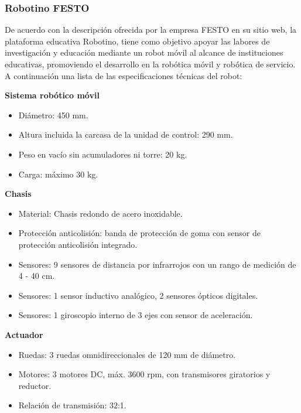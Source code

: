             \subsubsection{Robotino FESTO}
            De acuerdo con la descripción ofrecida por la empresa FESTO en su sitio web, la plataforma educativa Robotino, tiene como objetivo apoyar las labores de investigación y educación mediante un robot móvil al alcance de instituciones educativas, promoviendo el desarrollo en la robótica móvil y robótica de servicio. A continuación una lista de las especificaciones técnicas del robot:
            \phantom{saltodelineaforzado >:D\\}
            
            \textbf{Sistema robótico móvil}
            \begin{itemize}
                \item Diámetro: 450 mm.
                \item Altura incluida la carcasa de la unidad de control: 290 mm.
                \item Peso en vacío sin acumuladores ni torre: 20 kg.
                \item Carga: máximo 30 kg.
            \end{itemize}
            
            \phantom{saltodelineaforzado >:D\\}
            
            \textbf{Chasis}
            \begin{itemize}
                \item Material: Chasis redondo de acero inoxidable.
                \item Protección anticolisión: banda de protección de goma con sensor de protección anticolisión integrado.
                \item Sensores: 9 sensores de distancia por infrarrojos con un rango de medición de 4 - 40 cm.
                \item Sensores: 1 sensor inductivo analógico, 2 sensores ópticos digitales.
                \item Sensores: 1 giroscopio interno de 3 ejes con sensor de aceleración.
            \end{itemize}\newpage
            
            \textbf{Actuador}
            \begin{itemize}
                \item Ruedas: 3 ruedas omnidireccionales de 120 mm de diámetro.
                \item Motores: 3 motores DC, máx. 3600 rpm, con transmisores giratorios y reductor.
                \item Relación de transmisión: 32:1.
            \end{itemize}

